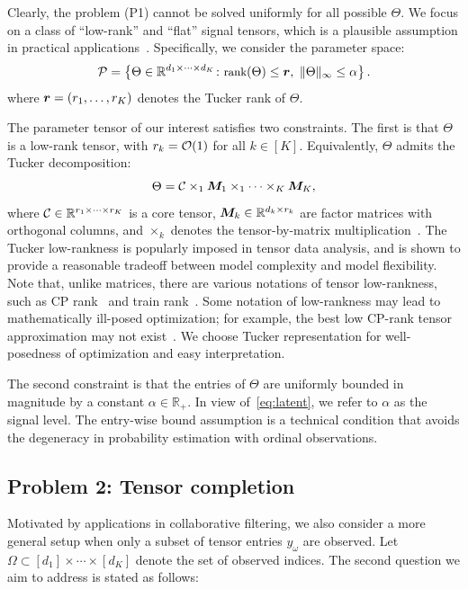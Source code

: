 \documentclass{article}
\theoremstyle{plain}
\theoremstyle{definition}
\begin{document}
Clearly, the problem (P1) cannot be solved uniformly for all possible $\Theta$. We focus on a class of ``low-rank'' and ``flat'' signal tensors, which is a plausible assumption in practical applications~\cite{zhou2013tensor,bhaskar20151}. Specifically, we consider the parameter space:
\begin{equation}\label{eq:space}
\small \tP=\left\{\Theta\in\mathbb{R}^{d_1\times \cdots \times d_K} \colon \text{rank}(\Theta)\leq \mr,\ \mnormSize{}{\Theta}\leq \alpha\right\}.
\end{equation}
where $\bm{r}=(r_1,\ldots,r_K)$ denotes the Tucker rank of $\Theta$.

The parameter tensor of our interest satisfies two constraints. The first is that $\Theta$ is a low-rank tensor, with $r_k=\mathcal{O}(1)$ for all $k\in[K]$. Equivalently, $\Theta$ admits the Tucker decomposition:
\begin{equation}\label{eq:Tucker}
\Theta=\mathcal{C}\times_1\bm M_1\times_1 \cdots \times_K \bm M_K,
\end{equation}
where $\mathcal{C}\in\mathbb{R}^{r_1\times \cdots \times r_K}$ is a core tensor, $\bm M_k\in\mathbb{R}^{d_k\times r_k}$ are factor matrices with orthogonal columns, and $\times_k$ denotes the tensor-by-matrix multiplication~\cite{kolda2009tensor}. The Tucker low-rankness is popularly imposed in tensor data analysis, and is shown to provide a reasonable tradeoff between model complexity and model flexibility. Note that, unlike matrices, there are various notations of tensor low-rankness, such as CP rank~\cite{hitchcock1927expression} and train rank~\cite{oseledets2011tensor}. Some notation of low-rankness may lead to mathematically ill-posed optimization; for example, the best low CP-rank tensor approximation may not exist~\cite{de2008tensor}. We choose Tucker representation for well-posedness of optimization and easy interpretation.

The second constraint is that the entries of $\Theta$ are uniformly bounded in magnitude by a constant $\alpha \in \mathbb{R}_{+}$. In view of~\eqref{eq:latent}, we refer to $\alpha$ as the signal level. The entry-wise bound assumption is a technical condition that avoids the degeneracy in probability estimation with ordinal observations.

\subsection{Problem 2: Tensor completion}
Motivated by applications in collaborative filtering, we also consider a more general setup when only a subset of tensor entries $y_\omega$ are observed. Let $\Omega\subset[d_1]\times \cdots\times[d_K]$ denote the set of observed indices. The second question we aim to address is stated as follows:
\end{document}
